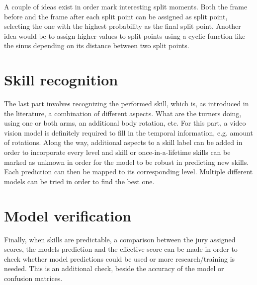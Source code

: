 A couple of ideas exist in order mark interesting split moments. Both the frame before and the frame after each split point can be assigned as split point, selecting the one with the highest probability as the final split point. Another idea would be to assign higher values to split points using a cyclic function like the sinus depending on its distance between two split points.

\section{Skill recognition}

The last part involves recognizing the performed skill, which is, as introduced in the literature, a combination of different aspects. What are the turners doing, using one or both arms, an additional body rotation, etc.
For this part, a video vision model is definitely required to fill in the temporal information, e.g. amount of rotations.
Along the way, additional aspects to a skill label can be added in order to incorporate every level and skill or once-in-a-lifetime skills can be marked as unknown in order for the model to be robust in predicting new skills. Each prediction can then be mapped to its corresponding level.
Multiple different models can be tried in order to find the best one.


\section{Model verification}

Finally, when skills are predictable, a comparison between the jury assigned scores, the models prediction and the effective score can be made in order to check whether model predictions could be used or more research/training is needed. This is an additional check, beside the accuracy of the model or confusion matrices.

